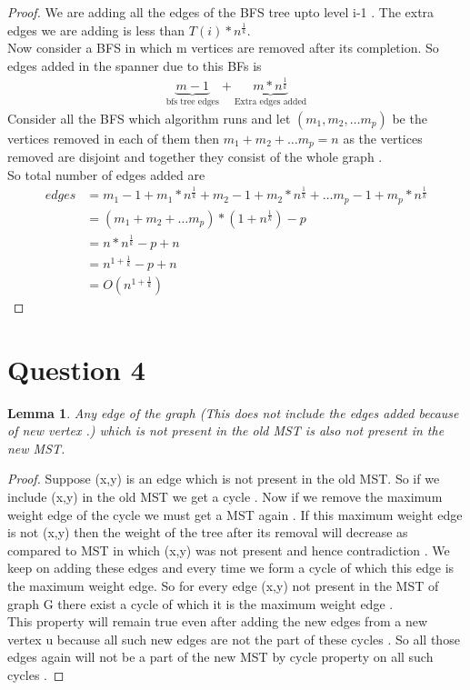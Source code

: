 \documentclass[11pt]{article}
\newtheorem{lemma}[theorem]{Lemma}
\begin{document}
\begin{proof}
We are adding all the edges of the BFS tree upto level i-1 . The extra edges we are adding is less than  $T(i) * n^{\frac{1}{k}}$. \\
Now consider a BFS in which m vertices are removed after its completion. 
So edges added in the spanner due to this BFs is 
\begin{align*}
\underbrace{m-1}_{\text{bfs tree edges}} + \underbrace{m*n^{\frac{1}{k}}}_{\text{Extra edges added}}
\end{align*}
Consider all the BFS which algorithm runs and let $(m_1,m_2, \ldots m_p)$ be the vertices removed in each of them then 
$m_1 + m_2 + \ldots m_p = n$ as the vertices removed are disjoint and together they consist of the whole graph . \\
So total number of edges added are 
\begin{align*}
edges &= m_{1} -1 + m_{1}*n^\frac{1}{k} + m_{2} -1 + m_{2}*n^\frac{1}{k} + \ldots m_{p} -1 + m_{p}*n^\frac{1}{k} \\
&= (m_{1} + m_{2} + \ldots m_{p})*(1+n^{\frac{1}{k}}) - p  \\
&= n*n^{\frac{1}{k}} - p + n  \\
&= n^{1+\frac{1}{k}} - p + n \\
&= O(n^{1+\frac{1}{k}})
\end{align*}
\end{proof}
\pagebreak
\section*{Question 4}
\begin{lemma}
Any edge of the graph (This does not include the edges added because of new vertex .) which is not present in the old MST is also not present in the new MST. 
\end{lemma}
\begin{proof}
Suppose (x,y) is an edge which is not present in the old MST. So if we include (x,y) in the old MST we get a cycle . Now if we remove the maximum weight edge of the  cycle we must get a MST again . If this maximum weight   edge is not (x,y) then the weight of the tree after its removal will decrease as compared to MST in which (x,y) was not present and hence contradiction . We keep on adding these edges and every time we form a cycle of which this edge is the maximum weight edge. So for every edge (x,y) not present in the MST of graph G there exist a cycle of which it is the maximum weight edge .  \\
This property will remain true even after adding the new edges from a new vertex u because all such new edges are not the part of these cycles  . So all those edges again will not be a part of the new MST by cycle property on all such cycles . 
\end{proof}
\end{document}
